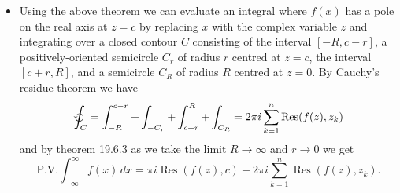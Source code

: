 \documentclass{article}
\newcommand{\Res}{\operatorname{Res}}
\begin{document}
\begin{itemize}
  \item Using the above theorem we can evaluate an integral where $f(x)$ has a pole on the real axis at $z = c$ by replacing $x$ with the complex variable $z$ and integrating over a closed contour $C$ consisting of the interval $[-R, c - r]$, a positively-oriented semicircle $C_r$ of radius $r$ centred at $z = c$, the interval $[c + r, R]$, and a semicircle $C_R$ of radius $R$ centred at $z = 0$. By Cauchy's residue theorem we have \[\varointctrclockwise_C = \int_{-R}^{c - r} + \int_{-C_r} + \int_{c + r}^R + \int_{C_R} = 2 \pi i \sum_{k = 1}^n \Res(f(z), z_k)\] and by theorem 19.6.3 as we take the limit $R \rightarrow \infty$ and $r \rightarrow 0$ we get \[\text{P.V.} \int_{-\infty}^\infty f(x) \,d x = \pi i \Res(f(z), c) + 2 \pi i \sum_{k = 1}^n \Res(f(z), z_k).\]
\end{itemize}
\end{document}
